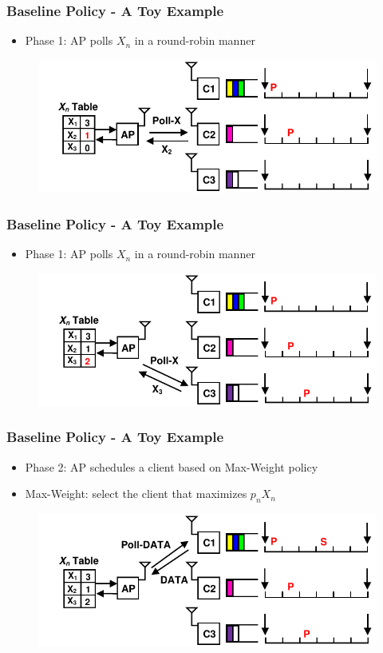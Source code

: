 \documentclass{beamer}
\begin{document}
\begin{frame}
\frametitle{Baseline Policy - A Toy Example}
\begin{itemize}
\item Phase 1: AP polls $X_n$ in a round-robin manner
\end{itemize}
\begin{figure}
\centering
\includegraphics[scale=0.8]{animation_02.pdf}
\end{figure}
\end{frame}

\begin{frame}
\frametitle{Baseline Policy - A Toy Example}
\begin{itemize}
\item Phase 1: AP polls $X_n$ in a round-robin manner
\end{itemize}
\begin{figure}
\centering
\includegraphics[scale=0.8]{animation_03.pdf}
\end{figure}
\end{frame}

\begin{frame}
\frametitle{Baseline Policy - A Toy Example}
\begin{itemize}
\item Phase 2: AP schedules a client based on Max-Weight policy
\item Max-Weight: select the client that maximizes $p_nX_n$
\end{itemize}
\begin{figure}
\centering
\includegraphics[scale=0.8]{animation_04.pdf}
\end{figure}
\end{frame}
\end{document}
